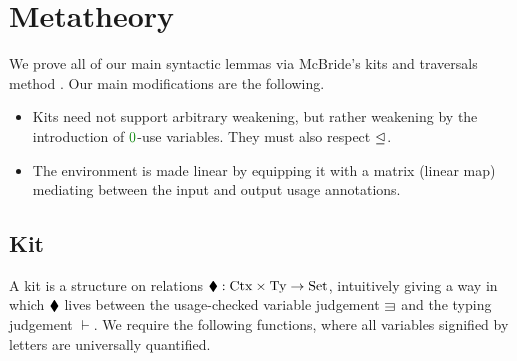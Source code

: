 \documentclass[submission,copyright,creativecommons]{eptcs}
\begin{document}

\section{Metatheory}

We prove all of our main syntactic lemmas via McBride's kits and traversals
method \cite{rensub05}.
Our main modifications are the following.
\begin{itemize}
  \item Kits need not support arbitrary weakening, but rather weakening by the
    introduction of $\rescomment 0$-use variables.
    They must also respect $\trianglelefteq$.
  \item The environment is made linear by equipping it with a matrix (linear
    map) mediating between the input and output usage annotations.
\end{itemize}

\subsection{Kit}

A kit is a structure on relations
$\mathbin{\blacklozenge} : \mathrm{Ctx} \times \mathrm{Ty} \to \mathrm{Set}$, intuitively
giving a way in which $\mathbin{\blacklozenge}$ lives between the usage-checked variable
judgement $\lvar$ and the typing judgement $\vdash$.
We require the following functions, where all variables signified by letters are
universally quantified.
\end{document}
